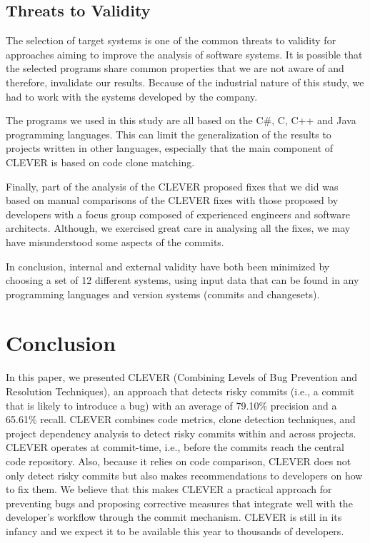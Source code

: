 \documentclass[sigconf]{acmart}
\begin{document}
\subsection{Threats to Validity}\label{threats-to-validity}

The selection of target systems is one of the common threats to validity
for approaches aiming to improve the analysis of software systems. It is
possible that the selected programs share common properties that we are
not aware of and therefore, invalidate our results. Because of the
industrial nature of this study, we had to work with the systems
developed by the company.

The programs we used in this study are all based on the C\#, C, C++ and
Java programming languages. This can limit the generalization of the
results to projects written in other languages, especially that the main
component of CLEVER is based on code clone matching.

Finally, part of the analysis of the CLEVER proposed fixes that we did
was based on manual comparisons of the CLEVER fixes with those proposed
by developers with a focus group composed of experienced engineers and
software architects. Although, we exercised great care in analysing all
the fixes, we may have misunderstood some aspects of the commits.

In conclusion, internal and external validity have both been minimized
by choosing a set of 12 different systems, using input data that can be
found in any programming languages and version systems (commits and
changesets).

\section{Conclusion}\label{sec:conclusion}

In this paper, we presented CLEVER (Combining Levels of Bug Prevention
and Resolution Techniques), an approach that detects risky commits
(i.e., a commit that is likely to introduce a bug) with an average of
79.10\% precision and a 65.61\% recall. CLEVER combines code metrics,
clone detection techniques, and project dependency analysis to detect
risky commits within and across projects. CLEVER operates at
commit-time, i.e., before the commits reach the central code repository.
Also, because it relies on code comparison, CLEVER does not only detect
risky commits but also makes recommendations to developers on how to fix
them. We believe that this makes CLEVER a practical approach for
preventing bugs and proposing corrective measures that integrate well
with the developer's workflow through the commit mechanism. CLEVER is
still in its infancy and we expect it to be available this year to
thousands of developers.
\end{document}

